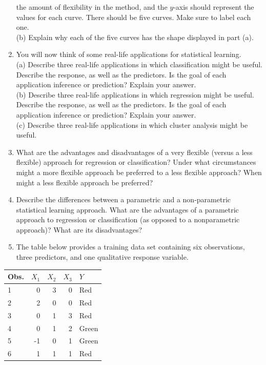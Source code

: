 \documentclass[10pt]{article}
\begin{document}
\begin{enumerate}
the amount of flexibility in the method, and the $y$-axis should represent the values for each curve. There should be five curves. Make sure to label each one.\\
(b) Explain why each of the five curves has the shape displayed in part (a).
  \item You will now think of some real-life applications for statistical learning.\\
(a) Describe three real-life applications in which classification might be useful. Describe the response, as well as the predictors. Is the goal of each application inference or prediction? Explain your answer.\\
(b) Describe three real-life applications in which regression might be useful. Describe the response, as well as the predictors. Is the goal of each application inference or prediction? Explain your answer.\\
(c) Describe three real-life applications in which cluster analysis might be useful.
  \item What are the advantages and disadvantages of a very flexible (versus a less flexible) approach for regression or classification? Under what circumstances might a more flexible approach be preferred to a less flexible approach? When might a less flexible approach be preferred?
  \item Describe the differences between a parametric and a non-parametric statistical learning approach. What are the advantages of a parametric approach to regression or classification (as opposed to a nonparametric approach)? What are its disadvantages?
  \item The table below provides a training data set containing six observations, three predictors, and one qualitative response variable.
\end{enumerate}

\begin{center}
\begin{tabular}{l|rrrl}
\hline
Obs. & $X_{1}$ & $X_{2}$ & $X_{3}$ & $Y$ \\
\hline
1 & 0 & 3 & 0 & Red \\
2 & 2 & 0 & 0 & Red \\
3 & 0 & 1 & 3 & Red \\
4 & 0 & 1 & 2 & Green \\
5 & -1 & 0 & 1 & Green \\
6 & 1 & 1 & 1 & Red \\
\hline
\end{tabular}
\end{center}
\end{document}
